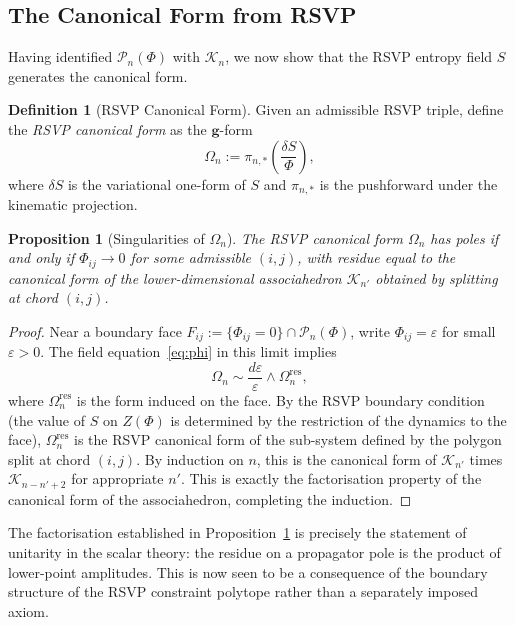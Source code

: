 \documentclass[12pt, oneside]{amsart}
\theoremstyle{plain}
\newtheorem{proposition}[theorem]{Proposition}
\theoremstyle{definition}
\newtheorem{definition}[theorem]{Definition}
\theoremstyle{remark}
\newcommand{\eps}{\varepsilon}
\newcommand{\Assoc}{\mathcal{K}_n}
\newcommand{\CF}{\Omega}   %
\begin{document}
\subsection{The Canonical Form from RSVP}

Having identified $\mathcal{P}_n(\Phi)$ with $\Assoc$, we now show that the RSVP entropy field $S$ generates the canonical form.

\begin{definition}[RSVP Canonical Form]
\label{def:rsvp-cf}
Given an admissible RSVP triple, define the \emph{RSVP canonical form} as the $\mathbf{g}$-form
\begin{equation}
\label{eq:rsvp-cf}
  \CF_n := \pi_{n,*}\!\left(\frac{\delta S}{\Phi}\right),
\end{equation}
where $\delta S$ is the variational one-form of $S$ and $\pi_{n,*}$ is the pushforward under the kinematic projection.
\end{definition}

\begin{proposition}[Singularities of $\CF_n$]
\label{prop:cf-singularities}
The RSVP canonical form $\CF_n$ has poles if and only if $\Phi_{ij} \to 0$ for some admissible $(i,j)$, with residue equal to the canonical form of the lower-dimensional associahedron $\mathcal{K}_{n'}$ obtained by splitting at chord $(i,j)$.
\end{proposition}

\begin{proof}
Near a boundary face $F_{ij} := \{\Phi_{ij} = 0\} \cap \mathcal{P}_n(\Phi)$, write $\Phi_{ij} = \eps$ for small $\eps > 0$. The field equation~\eqref{eq:phi} in this limit implies
\[
  \CF_n \sim \frac{d\eps}{\eps} \wedge \CF_{n}^{\text{res}},
\]
where $\CF_n^{\text{res}}$ is the form induced on the face. By the RSVP boundary condition (the value of $S$ on $Z(\Phi)$ is determined by the restriction of the dynamics to the face), $\CF_n^{\text{res}}$ is the RSVP canonical form of the sub-system defined by the polygon split at chord $(i,j)$. By induction on $n$, this is the canonical form of $\mathcal{K}_{n'}$ times $\mathcal{K}_{n-n'+2}$ for appropriate $n'$. This is exactly the factorisation property of the canonical form of the associahedron, completing the induction.
\end{proof}

The factorisation established in Proposition~\ref{prop:cf-singularities} is precisely the statement of unitarity in the scalar theory: the residue on a propagator pole is the product of lower-point amplitudes. This is now seen to be a consequence of the boundary structure of the RSVP constraint polytope rather than a separately imposed axiom.
\end{document}
